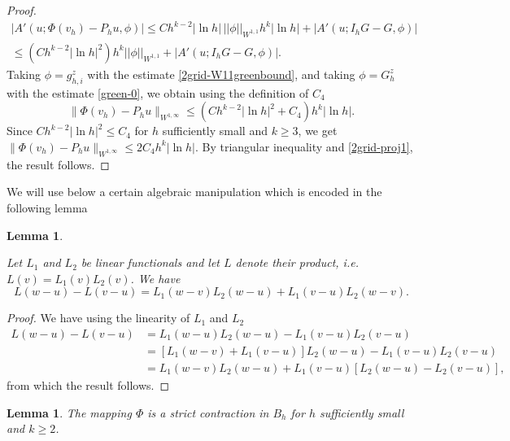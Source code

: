 \documentclass[12pt]{amsart}
\numberwithin{equation}{section}
\newtheorem{lemma}[thm]{Lemma}
\begin{document}
\begin{proof}
\begin{multline*}
| A'(u;\Phi( v_h)- P_h u,\phi)   | \leq C h^{k-2}  |\ln h | \, || \phi ||_{W^{1,1}}   h^{k} |\ln h | + |A'(u;I_h G - G, \phi)| \\
\leq (C h^{k-2} |\ln h |^2  ) h^{k} || \phi ||_{W^{1,1}} + | A'(u;I_h G - G, \phi)| .
\end{multline*}
Taking $\phi=g^z_{h,i}$ with the estimate \eqref{2grid-W11greenbound}, and taking $\phi=G^z_h$ with the estimate \eqref{green-0}, we obtain using the definition of $C_4$
$$
\|\Phi( v_h)- P_h u\|_{W^{1,\infty}} \leq   (C h^{k-2} |\ln h |^2 + C_4 ) h^{k } |\ln h|.
$$
Since $C  h^{k-2} |\ln h |^2  \leq C_4$ for $h$ sufficiently small and $k \geq 3$, we get
$\|\Phi( v_h)- P_h u\|_{W^{1,\infty}} \leq 2 C_4  h^{k } |\ln h|$.
By triangular inequality and \eqref{2grid-proj1}, the result follows.



\end{proof}

We will use below a certain algebraic manipulation which is encoded in the following lemma

\begin{lemma} \label{algebraic}

Let $L_1$ and  $L_2$ be linear functionals and let $L$ denote their product, i.e. $L(v) = L_1(v) L_2(v)$. We have
$$
L(w-u) - L(v-u) = L_1(w-v)L_2(w-u) + L_1(v-u) L_2 (w-v).
$$

\end{lemma}

\begin{proof}
We have using the linearity of $L_1$ and $L_2$
\begin{align*}
L(w-u) - L(v-u) & =  L_1(w-u)L_2(w-u) - L_1(v-u) L_2 (v-u) \\
& = [L_1(w-v) + L_1(v-u)] L_2(w-u) - L_1(v-u) L_2 (v-u) \\
& =  L_1(w-v)L_2(w-u) +  L_1(v-u) [ L_2(w-u) -  L_2 (v-u) ],
\end{align*}
from which the result follows.


\end{proof}

\begin{lemma} \label{contraction}
The mapping $\Phi$ is a strict contraction in $B_h$ for $h$ sufficiently small and $k \geq 2$.
\end{lemma}
\end{document}

